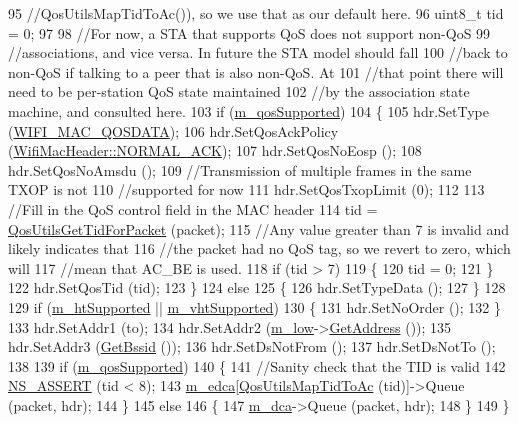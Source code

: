 \begin{DoxyCode}
95   \textcolor{comment}{//QosUtilsMapTidToAc()), so we use that as our default here.}
96   uint8\_t tid = 0;
97 
98   \textcolor{comment}{//For now, a STA that supports QoS does not support non-QoS}
99   \textcolor{comment}{//associations, and vice versa. In future the STA model should fall}
100   \textcolor{comment}{//back to non-QoS if talking to a peer that is also non-QoS. At}
101   \textcolor{comment}{//that point there will need to be per-station QoS state maintained}
102   \textcolor{comment}{//by the association state machine, and consulted here.}
103   \textcolor{keywordflow}{if} (\hyperlink{classns3_1_1RegularWifiMac_aeecdb918687493a8efdd70304bc0cee9}{m\_qosSupported})
104     \{
105       hdr.SetType (\hyperlink{namespacens3_a9318472db39b35b2092de5c721e6ab0aafd37aea1ac3edba5410fac6367b19b1d}{WIFI\_MAC\_QOSDATA});
106       hdr.SetQosAckPolicy (\hyperlink{classns3_1_1WifiMacHeader_ae3a382482f357972019f5e1b3162adc4a9f52b9c6ca65d046ce2be9d70bce28cf}{WifiMacHeader::NORMAL\_ACK});
107       hdr.SetQosNoEosp ();
108       hdr.SetQosNoAmsdu ();
109       \textcolor{comment}{//Transmission of multiple frames in the same TXOP is not}
110       \textcolor{comment}{//supported for now}
111       hdr.SetQosTxopLimit (0);
112 
113       \textcolor{comment}{//Fill in the QoS control field in the MAC header}
114       tid = \hyperlink{group__wifi_gaa7ad20082f78b63633d0557d24927150}{QosUtilsGetTidForPacket} (packet);
115       \textcolor{comment}{//Any value greater than 7 is invalid and likely indicates that}
116       \textcolor{comment}{//the packet had no QoS tag, so we revert to zero, which will}
117       \textcolor{comment}{//mean that AC\_BE is used.}
118       \textcolor{keywordflow}{if} (tid > 7)
119         \{
120           tid = 0;
121         \}
122       hdr.SetQosTid (tid);
123     \}
124   \textcolor{keywordflow}{else}
125     \{
126       hdr.SetTypeData ();
127     \}
128 
129   \textcolor{keywordflow}{if} (\hyperlink{classns3_1_1RegularWifiMac_a8950c44b8cf2ad1f9274821cf88adc7b}{m\_htSupported} || \hyperlink{classns3_1_1RegularWifiMac_a151f330fdeb3f83f9ec7cf07537f0e86}{m\_vhtSupported})
130     \{
131       hdr.SetNoOrder ();
132     \}
133   hdr.SetAddr1 (to);
134   hdr.SetAddr2 (\hyperlink{classns3_1_1RegularWifiMac_a726ce0ade9bb7e6b7d81cd397f32dbde}{m\_low}->\hyperlink{classns3_1_1MacLow_a109922d4f2bb1ee0b2a66aa3bcc48e2f}{GetAddress} ());
135   hdr.SetAddr3 (\hyperlink{classns3_1_1RegularWifiMac_acd1705832e3f4a235c2ca6a84b5a577b}{GetBssid} ());
136   hdr.SetDsNotFrom ();
137   hdr.SetDsNotTo ();
138 
139   \textcolor{keywordflow}{if} (\hyperlink{classns3_1_1RegularWifiMac_aeecdb918687493a8efdd70304bc0cee9}{m\_qosSupported})
140     \{
141       \textcolor{comment}{//Sanity check that the TID is valid}
142       \hyperlink{assert_8h_a6dccdb0de9b252f60088ce281c49d052}{NS\_ASSERT} (tid < 8);
143       \hyperlink{classns3_1_1RegularWifiMac_ac750365ab3708902cc0b7700164c706d}{m\_edca}[\hyperlink{group__wifi_ga4e36efcff6dd83eaee42e1af0de43d48}{QosUtilsMapTidToAc} (tid)]->Queue (packet, hdr);
144     \}
145   \textcolor{keywordflow}{else}
146     \{
147       \hyperlink{classns3_1_1RegularWifiMac_a152965c3def1a308b088b37c2c88a1a2}{m\_dca}->Queue (packet, hdr);
148     \}
149 \}
\end{DoxyCode}


